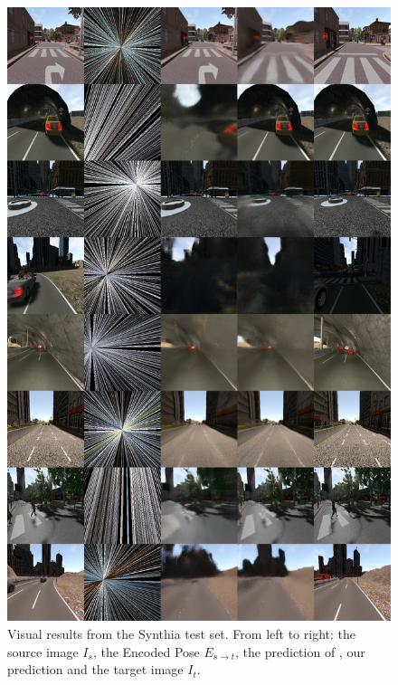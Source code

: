 \begin{figure}[htp!]
    \begin{center}
    \includegraphics[width=.9\textwidth]{images/epipolarnvs/SuppMat_Synthia.jpg}
    \end{center}
     \caption{Visual results from the Synthia \cite{Synthia} test set. From left to right: the source image  $I_s$, the Encoded Pose $E_{s\xrightarrow{}t}$,  the prediction of \cite{NVS_skip}, our prediction and the target image $I_t$.}
     \label{fig:add_visSynthia}
\end{figure}

